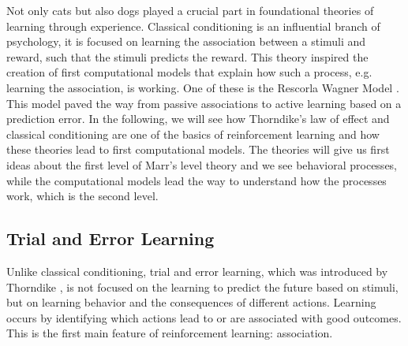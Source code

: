 Not only cats but also dogs played a crucial part in foundational theories of learning through experience. 
Classical conditioning \citep{pavlov1927conditional} is an influential branch of psychology, it is focused on learning the association between a stimuli and reward, such that the stimuli predicts the reward. %
This theory inspired the creation of first computational models that explain how such a process, e.g. learning the association, is working.  
One of these is the Rescorla Wagner Model \citep{rescorla1972theory}. This model paved the way from passive associations to active learning based on a prediction error.
In the following, we will see how Thorndike's law of effect and classical conditioning are one of the basics of reinforcement learning and how these theories lead to first computational models. The theories will give us first ideas about the first level of Marr's level theory and we see behavioral processes, while the computational models lead the way to understand how the processes work, which is the second level. 

\subsection{Trial and Error Learning}
Unlike classical conditioning, trial and error learning, which was introduced by Thorndike \citep{thorndike1927law}, is not focused on the learning to predict the future based on stimuli, but on learning behavior and the consequences of different actions. Learning occurs by identifying which actions lead to or are associated with good outcomes. This is the first main feature of reinforcement learning: association. 

